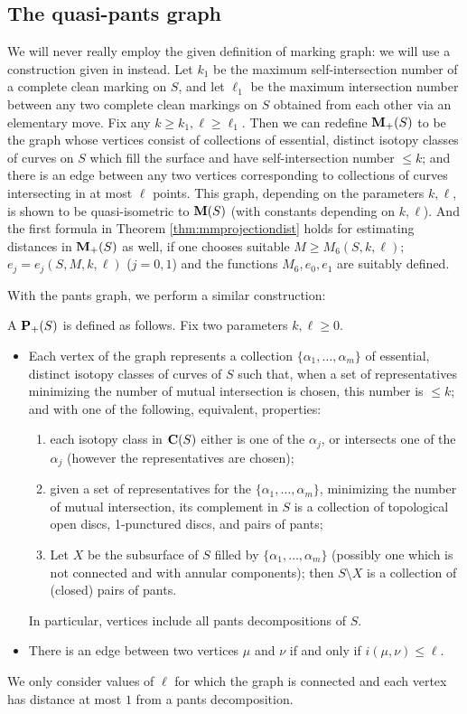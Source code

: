 \subsection{The quasi-pants graph}
We will never really employ the given definition of marking graph: we will use a construction given in \cite{mms} instead. Let $k_1$ be the maximum self-intersection number of a complete clean marking on $S$, and let $\ell_1$ be the maximum intersection number between any two complete clean markings on $S$ obtained from each other via an elementary move. Fix any $k\geq k_1, \ell\geq \ell_1$. Then we can redefine ${\mathbf{M}_+}(S)$ to be the graph whose vertices consist of collections of essential, distinct isotopy classes of curves on $S$ which fill the surface and have self-intersection number $\leq k$; and there is an edge between any two vertices corresponding to collections of curves intersecting in at most $\ell$ points. This graph, depending on the parameters $k,\ell$, is shown to be quasi-isometric to $\mathbf M(S)$ (with constants depending on $k,\ell$). And the first formula in Theorem \ref{thm:mmprojectiondist} holds for estimating distances in ${\mathbf{M}_+}(S)$ as well, if one chooses suitable $M\geq M_6(S,k,\ell)$; $e_j=e_j(S,M,k,\ell)$ ($j=0,1$) and the functions $M_6,e_0,e_1$ are suitably defined.

With the pants graph, we perform a similar construction:
\begin{defin}\label{def:quasipants}
A  ${\mathbf{P}_+}(S)$ is defined as follows. Fix two parameters $k,\ell\geq 0$.
\begin{itemize}
\item Each vertex of the graph represents a collection $\{\alpha_1,\ldots,\alpha_m\}$ of essential, distinct isotopy classes of curves of $S$ such that, when a set of representatives minimizing the number of mutual intersection is chosen, this number is $\leq k$; and with one of the following, equivalent, properties:
\begin{enumerate}[label=\alph*)]
\item each isotopy class in $\mathbf C(S)$ either is one of the $\alpha_j$, or intersects one of the $\alpha_j$ (however the representatives are chosen);
\item given a set of representatives for the $\{\alpha_1,\ldots,\alpha_m\}$, minimizing the number of mutual intersection, its complement in $S$ is a collection of topological open discs, 1-punctured discs, and pairs of pants;
\item Let $X$ be the subsurface of $S$ filled by $\{\alpha_1,\ldots,\alpha_m\}$ (possibly one which is not connected and with annular components); then $S\setminus X$ is a collection of (closed) pairs of pants.
\end{enumerate}
In particular, vertices include all pants decompositions of $S$.
\item There is an edge between two vertices $\mu$ and $\nu$ if and only if $i(\mu,\nu)\leq\ell$.
\end{itemize}
We only consider values of $\ell$ for which the graph is connected and each vertex has distance at most $1$ from a pants decomposition.
\end{defin}

